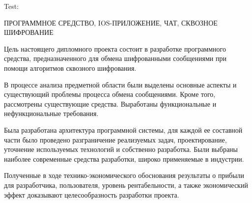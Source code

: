 \thispagestyle{empty}


\begin{center}
	Test: \totalpages

	\MakeUppercase{Программное средство, iOS-приложение, чат, сквозное шифрование}
\end{center}

Цель настоящего дипломного проекта состоит в разработке программного средства, предназначенного для обмена шифрованными сообщениями при помощи алгоритмов сквозного шифрования. 

В процессе анализа предметной области были выделены основные аспекты и существующий проблемы процесса обмена сообщениями. Кроме того, рассмотрены существующие средства. Выработаны функциональные и нефункциональные требования.

Была разработана архитектура программной системы, для каждой ее составной части было проведено разграничение реализуемых задач, проектирование, уточнение используемых технологий и собственно разработка. Были выбраны наиболее современные средства разработки, широко применяемые в индустрии. 

Полученные в ходе технико-экономического обоснования результаты о прибыли для разработчика, пользователя, уровень рентабельности, а также экономический эффект доказывают целесообразность разработки про\-екта.

